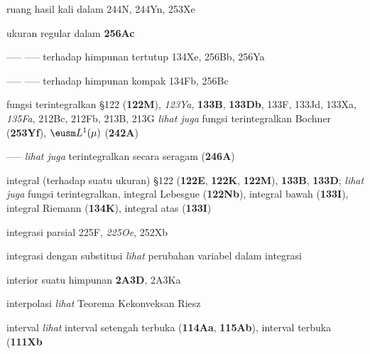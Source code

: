 ruang hasil kali dalam 244N, 244Yn, 253Xe




ukuran regular dalam {\bf 256Ac}





----- ----- terhadap himpunan tertutup 134Xe,
  256Bb, 256Ya


----- ----- terhadap himpunan kompak 134Fb,
  256Bc








fungsi terintegralkan \S122 ({\bf 122M}), {\it 123Ya}, {\bf 133B}, {\bf
133Db}, 133F, 133Jd, 133Xa, {\it 135Fa},
  212Bc, 212Fb, 213B, 213G
  {\it lihat juga} fungsi terintegralkan Bochner ({\bf 253Yf}),
$\eusm L^1(\mu)$ ({\bf 242A})


----- {\it lihat juga} terintegralkan secara seragam ({\bf 246A})


integral (terhadap suatu ukuran)
\S122 ({\bf 122E}, {\bf 122K}, {\bf 122M}), {\bf 133B}, {\bf
133D}; 
  {\it lihat juga}
fungsi terintegralkan, integral Lebesgue ({\bf 122Nb}),
integral bawah ({\bf 133I}), integral Riemann ({\bf 134K}), integral atas ({\bf 133I})










integrasi parsial 225F, {\it 225Oe}, 252Xb


integrasi dengan substitusi {\it lihat}
perubahan variabel dalam integrasi




interior suatu himpunan {\bf 2A3D}, 2A3Ka


interpolasi {\it lihat} Teorema Kekonveksan Riesz









interval
  {\it lihat}
interval setengah terbuka
({\bf 114Aa}, {\bf 115Ab}), interval terbuka ({\bf 111Xb}





















